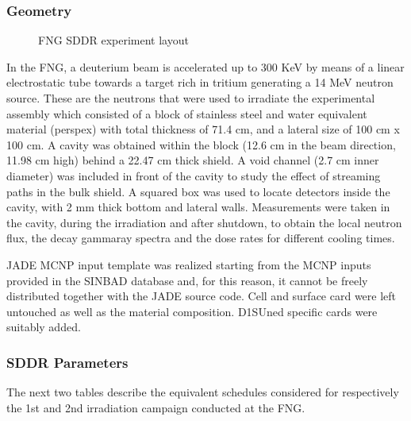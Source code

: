 \documentclass[letterpaper,10pt,english]{sphinxmanual}
\let\sphinxpxdimen\pdfpxdimen\else\newdimen\sphinxpxdimen
\begin{document}
\subsubsection{Geometry}
\label{\detokenize{usage/benchmarks:geometry}}
\begin{figure}[htbp]
\centering
\capstart

\noindent\sphinxincludegraphics[width=600\sphinxpxdimen]{{fng}.jpg}
\caption{FNG SDDR experiment layout}\label{\detokenize{usage/benchmarks:id32}}\end{figure}

In the FNG, a deuterium beam is accelerated up to 300 KeV by means of a linear electro\sphinxhyphen{}static
tube towards a target rich in tritium generating a 14 MeV neutron source. These are the
neutrons that were used to irradiate the experimental assembly which consisted of a block of
stainless steel and water equivalent material (perspex) with total thickness of 71.4 cm, and
a lateral size of 100 cm x 100 cm. A cavity was obtained within the block (12.6 cm in the beam
direction, 11.98 cm high) behind a 22.47 cm thick shield. A void channel (2.7 cm inner diameter)
was included in front of the cavity to study the effect of streaming paths in the bulk shield.
A squared box was used to locate detectors inside the cavity, with 2 mm thick bottom and lateral walls.
Measurements were taken in the cavity, during the irradiation and after shut\sphinxhyphen{}down, to obtain the
local neutron flux, the decay gamma\sphinxhyphen{}ray spectra and the dose rates for different cooling times.

JADE MCNP input template was realized starting from the MCNP inputs provided in the SINBAD database
and, for this reason, it cannot be freely distributed together with the JADE source code.
Cell and surface card were left untouched as well as the material composition. D1S\sphinxhyphen{}Uned specific
cards were suitably added.


\subsubsection{SDDR Parameters}
\label{\detokenize{usage/benchmarks:id14}}
The next two tables describe the equivalent schedules considered for respectively the 1st and 2nd
irradiation campaign conducted at the FNG.
\end{document}
